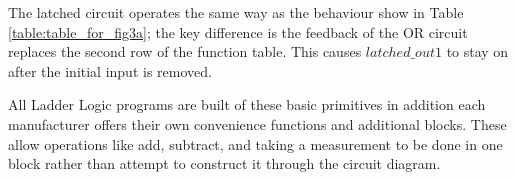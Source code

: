 The latched circuit operates the same way as the behaviour show in Table \ref{table:table_for_fig3a}; the key difference is the feedback of the OR circuit replaces the second row of the function table. This causes $latched\_out1$ to stay on after the initial input is removed.

All Ladder Logic programs are built of these basic primitives in addition each manufacturer offers their own convenience functions and additional blocks. These allow operations like add, subtract, and taking a measurement to be done in one block rather than attempt to construct it through the circuit diagram.
